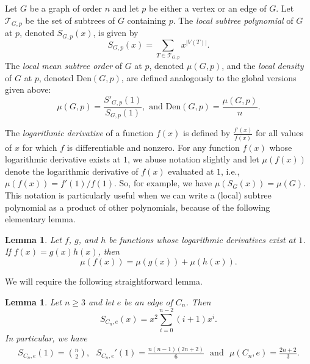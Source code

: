 \documentclass[12pt]{article}
\newcommand{\den}{\mbox{Den}}
\newtheorem{lemma}[theorem]{Lemma}
\theoremstyle{definition}
\begin{document}
Let $G$ be a graph of order $n$ and let $p$ be either a vertex or an edge of $G$.  Let $\mathcal{T}_{G,p}$ be the set of subtrees of $G$ containing $p$.  The \emph{local subtree polynomial} of $G$ at $p$, denoted $S_{G,p}(x)$, is given by
\[
S_{G,p}(x)=\sum_{T\in \mathcal{T}_{G,p}}x^{|V(T)|}.
\]
The \emph{local mean subtree order} of $G$ at $p$, denoted $\mu(G,p)$, and
the \emph{local density} of $G$ at $p$, denoted $\den(G,p)$, are defined analogously to the global versions given above:
\[
\mu(G,p)=\frac{S'_{G,p}(1)}{S_{G,p}(1)}, \mbox{ and } \den(G,p)=\frac{\mu(G,p)}{n}.
\]

The \textit{logarithmic derivative} of a function $f(x)$ is defined by $\frac{f'(x)}{f(x)}$ for all values of $x$ for which $f$ is differentiable and nonzero. For any function $f(x)$ whose logarithmic derivative exists at $1$, we abuse notation slightly and let $\mu(f(x))$ denote the logarithmic derivative of $f(x)$ evaluated at $1$, i.e., $\mu(f(x))=f'(1)/f(1).$  So, for example, we have $\mu(S_G(x))=\mu(G)$.  This notation is particularly useful when we can write a (local) subtree polynomial as a product of other polynomials, because of the following elementary lemma.

\begin{lemma}\label{logsum}
Let $f$, $g$, and $h$ be functions whose logarithmic derivatives exist at $1$.  If $f(x)=g(x)h(x)$, then
\[
\mu(f(x))=\mu(g(x))+\mu(h(x)).
\]
\end{lemma}

We will require the following straightforward lemma.

\begin{lemma}\label{LocalCycleLemma}
Let $n\geq 3$ and let $e$ be an edge of $C_n$.  Then
\[
S_{C_n,e}(x)=x^2\sum_{i=0}^{n-2}(i+1)x^i.
\]
In particular, we have
\begin{align*}
S_{C_n,e}(1)=\binom{n}{2}, \ \ \ S_{C_n,e}'(1)=\frac{n(n-1)(2n+2)}{6} \ \ \ \mbox{and} \ \ \ \mu(C_n,e)=\frac{2n+2}{3}.
\end{align*}
\end{lemma}
\end{document}
